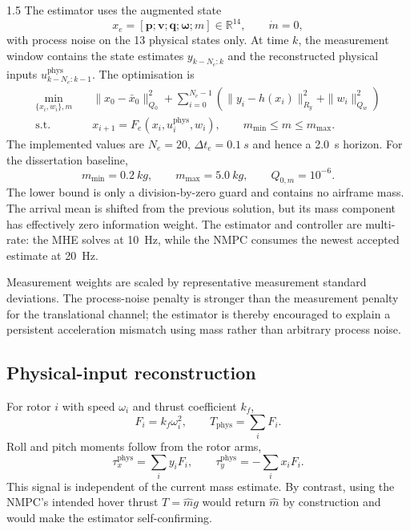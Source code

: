 \begin{spacing}{1.5}
The estimator uses the augmented state
\begin{equation}
x_e=[\bm p;\bm v;\bm q;\bm\omega;m]\in\mathbb{R}^{14},
\qquad \dot m=0,
\end{equation}
with process noise on the 13 physical states only. At time $k$, the measurement window contains the state estimates $y_{k-N_e:k}$ and the reconstructed physical inputs $u^{\mathrm{phys}}_{k-N_e:k-1}$. The optimisation is
\begin{align}
\min_{\{x_i,w_i\},m}\quad&
\|x_0-\bar x_0\|_{Q_0}^2+
\sum_{i=0}^{N_e-1}\left(
\|y_i-h(x_i)\|_{R_y}^2+\|w_i\|_{Q_w}^2\right) \\
\text{s.t.}\quad&
x_{i+1}=F_e(x_i,u_i^{\mathrm{phys}},w_i),\qquad
m_{\min}\le m\le m_{\max}.
\label{eq:mhe-framework}
\end{align}
The implemented values are $N_e=20$, $\Delta t_e=\SI{0.1}{s}$ and hence a \SI{2.0}{s} horizon. For the dissertation baseline,
\[
m_{\min}=\SI{0.2}{kg},\qquad m_{\max}=\SI{5.0}{kg},
\qquad Q_{0,m}=10^{-6}.
\]
The lower bound is only a division-by-zero guard and contains no airframe mass. The arrival mean is shifted from the previous solution, but its mass component has effectively zero information weight. The estimator and controller are multi-rate: the MHE solves at \SI{10}{Hz}, while the NMPC consumes the newest accepted estimate at \SI{20}{Hz}.

Measurement weights are scaled by representative measurement standard deviations. The process-noise penalty is stronger than the measurement penalty for the translational channel; the estimator is thereby encouraged to explain a persistent acceleration mismatch using mass rather than arbitrary process noise.

\subsection{Physical-input reconstruction}

For rotor $i$ with speed $\omega_i$ and thrust coefficient $k_f$,
\begin{equation}
F_i=k_f\omega_i^2,\qquad
T_{\mathrm{phys}}=\sum_i F_i.
\end{equation}
Roll and pitch moments follow from the rotor arms,
\begin{equation}
\tau_x^{\mathrm{phys}}=\sum_i y_iF_i,\qquad
\tau_y^{\mathrm{phys}}=-\sum_i x_iF_i.
\end{equation}
This signal is independent of the current mass estimate. By contrast, using the NMPC's intended hover thrust $T=\hat m g$ would return $\hat m$ by construction and would make the estimator self-confirming.


\end{spacing}
